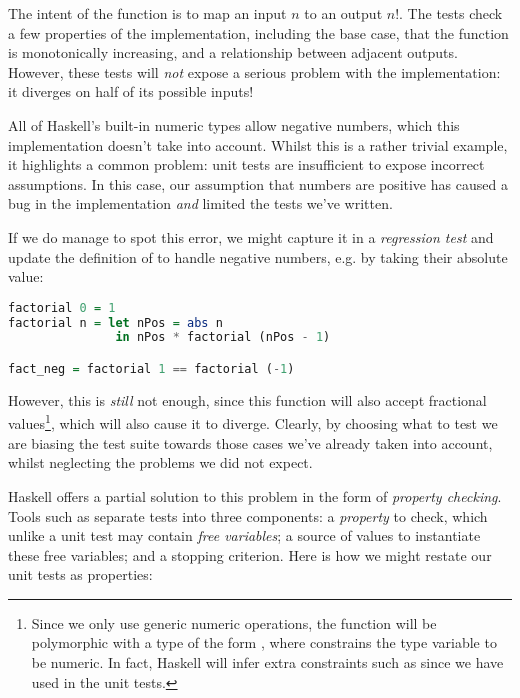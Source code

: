 The intent of the function is to map an input $n$ to an output $n!$. The tests check a few properties of the implementation, including the base case, that the function is monotonically increasing, and a relationship between adjacent outputs. However, these tests will \emph{not} expose a serious problem with the implementation: it diverges on half of its possible inputs!

All of Haskell's built-in numeric types allow negative numbers, which this implementation doesn't take into account. Whilst this is a rather trivial example, it highlights a common problem: unit tests are insufficient to expose incorrect assumptions. In this case, our assumption that numbers are positive has caused a bug in the implementation \emph{and} limited the tests we've written.

If we do manage to spot this error, we might capture it in a \emph{regression test} and update the definition of  to handle negative numbers, e.g. by taking their absolute value:

\iffalse TODO: Re-use these examples later on, e.g. for QuickSpec exploration \fi

\begin{lstlisting}[language=Haskell, xleftmargin=.2\textwidth, xrightmargin=.2\textwidth]
factorial 0 = 1
factorial n = let nPos = abs n
               in nPos * factorial (nPos - 1)

fact_neg = factorial 1 == factorial (-1)
\end{lstlisting}

However, this is \emph{still} not enough, since this function will also accept fractional values\footnote{Since we only use generic numeric operations, the function will be polymorphic with a type of the form , where  constrains the type variable  to be numeric. In fact, Haskell will infer extra constraints such as  since we have used \hs{==} in the unit tests.}, which will also cause it to diverge. Clearly, by choosing what to test we are biasing the test suite towards those cases we've already taken into account, whilst neglecting the problems we did not expect.

Haskell offers a partial solution to this problem in the form of \emph{property checking}. Tools such as \qcheck{} separate tests into three components: a \emph{property} to check, which unlike a unit test may contain \emph{free variables}; a source of values to instantiate these free variables; and a stopping criterion. Here is how we might restate our unit tests as properties:

